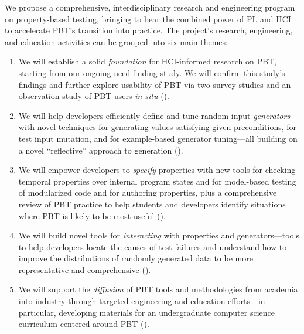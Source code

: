 
We propose a comprehensive, interdisciplinary research and engineering
program on
{property-based testing}, bringing to bear the combined power of PL and HCI to
accelerate PBT's transition into practice.  The project's research,
engineering, and education activities can be grouped into six main
themes: 
\begin{enumerate}[noitemsep]
\item We will establish a solid \emph{foundation} for HCI-informed research on PBT,
starting from our ongoing need-finding study. We will confirm
this study's findings and further explore usability of PBT via
two survey studies and an observation study
of PBT users {\em in situ} ().
%
\item We will help developers efficiently define and tune random input
\emph{generators} with novel techniques for generating values
satisfying given preconditions, for test input mutation, and for
example-based generator tuning---all building on a novel
``reflective'' approach to generation ().
%
\item We will empower developers to \emph{specify} properties with new
tools for checking temporal properties over internal program states
and for model-based testing of modularized code and for authoring
properties, plus a comprehensive review of PBT practice to help
students and developers identify situations where PBT is likely to be
most useful ().
%
\item We will build novel tools for {\em interacting} with properties
and generators---tools to help developers locate the causes of test
failures and understand how to improve the distributions of randomly
generated data to be more representative and
comprehensive\iflater{}\fi{} ().
%
\item We will support the {\em diffusion} of PBT tools and
methodologies from academia into industry through targeted engineering
and education efforts---in particular, developing materials for an
undergraduate computer science curriculum centered around PBT
().  
\end{enumerate}
